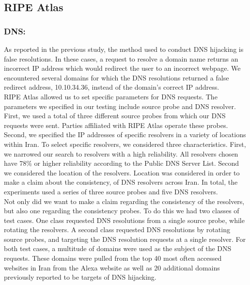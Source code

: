 \subsection{RIPE Atlas }

\subsubsection{DNS:} As reported in the previous study, the method used to conduct DNS hijacking is false resolutions. In these cases, a request to resolve a domain name returns an incorrect IP address which would redirect the user to an incorrect webpage. We encountered several domains for which the DNS resolutions returned a false redirect address, 10.10.34.36, instead of the domain$’$s correct IP address.  \\

        RIPE Atlas allowed us to set specific parameters for DNS requests. The parameters we specified in our testing include source probe and DNS resolver. First, we used a total of three different source probes from which our DNS requests were sent. Parties affiliated with RIPE Atlas operate these probes. Second, we specified the IP addresses of specific resolvers in a variety of locations within Iran. To select specific resolvers, we considered three characteristics. First, we narrowed our search to resolvers with a high reliability. All resolvers chosen have 78\% or higher reliability according to the Public DNS Server List. Second we considered the location of the resolvers. Location was considered in order to make a claim about the consistency, of DNS resolvers across Iran. In total, the experiments used a series of three source probes and five DNS resolvers. \\

        Not only did we want to make a claim regarding the consistency of the resolvers, but also one regarding the consistency probes. To do this we had two classes of test cases. One class requested DNS resolutions from a single source probe, while rotating the resolvers. A second class requested DNS resolutions by rotating source probes, and targeting the DNS resolution requests at a single resolver. For both test cases, a multitude of domains were used as the subject of the DNS requests. These domains were pulled from the top 40 most often accessed websites in Iran from the Alexa website as well as 20 additional domains previously reported to be targets of DNS hijacking. \\

